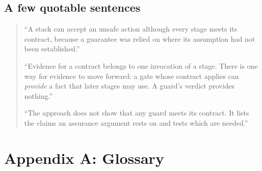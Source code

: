 \subsection{A few quotable sentences}

\begin{quote}
``A stack can accept an unsafe action although every stage meets its contract, because a guarantee was relied on where its assumption had not been established.''

\medskip
``Evidence for a contract belongs to one invocation of a stage. There is one way for evidence to move forward: a gate whose contract applies can \emph{provide} a fact that later stages may use. A guard's verdict provides nothing.''

\medskip
``The approach does not show that any guard meets its contract. It lists the claims an assurance argument rests on and tests which are needed.''
\end{quote}

\clearpage

\appendix
\section*{Appendix A: Glossary}

